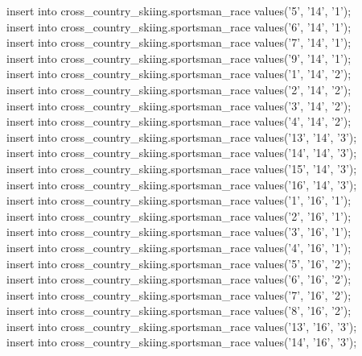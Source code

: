 \documentclass[a4paper,12pt]{article}
\begin{document}
insert into cross\_country\_skiing.sportsman\_race values('5',  '14',  '1');\\
insert into cross\_country\_skiing.sportsman\_race values('6',  '14',  '1');\\
insert into cross\_country\_skiing.sportsman\_race values('7',  '14',  '1');\\
insert into cross\_country\_skiing.sportsman\_race values('9',  '14',  '1');\\
insert into cross\_country\_skiing.sportsman\_race values('1',  '14',  '2');\\
insert into cross\_country\_skiing.sportsman\_race values('2',  '14',  '2');\\
insert into cross\_country\_skiing.sportsman\_race values('3',  '14',  '2');\\
insert into cross\_country\_skiing.sportsman\_race values('4',  '14',  '2');\\
insert into cross\_country\_skiing.sportsman\_race values('13', '14',  '3');\\
insert into cross\_country\_skiing.sportsman\_race values('14', '14',  '3');\\
insert into cross\_country\_skiing.sportsman\_race values('15', '14',  '3');\\
insert into cross\_country\_skiing.sportsman\_race values('16', '14',  '3');\\
insert into cross\_country\_skiing.sportsman\_race values('1',  '16',  '1');\\
insert into cross\_country\_skiing.sportsman\_race values('2',  '16',  '1');\\
insert into cross\_country\_skiing.sportsman\_race values('3',  '16',  '1');\\
insert into cross\_country\_skiing.sportsman\_race values('4',  '16',  '1');\\
insert into cross\_country\_skiing.sportsman\_race values('5',  '16',  '2');\\
insert into cross\_country\_skiing.sportsman\_race values('6',  '16',  '2');\\
insert into cross\_country\_skiing.sportsman\_race values('7',  '16',  '2');\\
insert into cross\_country\_skiing.sportsman\_race values('8',  '16',  '2');\\
insert into cross\_country\_skiing.sportsman\_race values('13', '16',  '3');\\
insert into cross\_country\_skiing.sportsman\_race values('14', '16',  '3');\\
\end{document}
